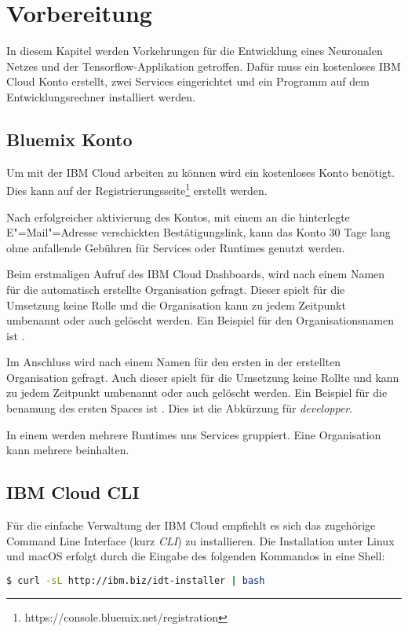 \section{Vorbereitung}
In diesem Kapitel werden Vorkehrungen für die Entwicklung eines Neuronalen Netzes und der Tensorflow-Applikation
getroffen. Dafür muss ein kostenloses IBM Cloud Konto erstellt, zwei Services eingerichtet und ein Programm auf dem
Entwicklungsrechner installiert werden.

\subsection{Bluemix Konto}
Um mit der IBM Cloud arbeiten zu können wird ein kostenloses Konto benötigt. Dies kann auf der
Registrierungsseite\footnote{https://console.bluemix.net/registration} erstellt werden.

Nach erfolgreicher aktivierung des Kontos, mit einem an die hinterlegte E"=Mail"=Adresse verschickten Bestätigungslink,
kann das Konto 30 Tage lang ohne anfallende Gebühren für Services oder Runtimes genutzt werden.

Beim erstmaligen Aufruf des IBM Cloud Dashboards, wird nach einem Namen für die automatisch erstellte Organisation gefragt.
Dieser spielt für die Umsetzung keine Rolle und die Organisation kann zu jedem Zeitpunkt umbenannt oder auch gelöscht werden.
Ein Beispiel für den Organisationsnamen ist .

Im Anschluss wird nach einem Namen für den ersten  in der erstellten Organisation gefragt. Auch dieser spielt
für die Umsetzung keine Rollte und kann zu jedem Zeitpunkt umbenannt oder auch gelöscht werden. Ein Beispiel für die
benamung des ersten Spaces ist . Dies ist die Abkürzung für \textit{developper}.

In einem  werden mehrere Runtimes uns Services gruppiert. Eine Organisation kann mehrere  beinhalten.

\subsection{IBM Cloud CLI}
Für die einfache Verwaltung der IBM Cloud empfiehlt es sich das zugehörige Command Line Interface (kurz \textit{CLI}) zu
installieren. Die Installation unter Linux und macOS erfolgt durch die Eingabe des folgenden Kommandos in eine Shell:

\begin{lstlisting}[language=bash, caption=Installation des IBM Cloud CLI, label=Installation des IBM Cloud CLI]
    $ curl -sL http://ibm.biz/idt-installer | bash
\end{lstlisting}


